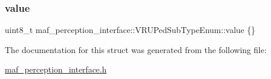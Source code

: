 \subsubsection{\texorpdfstring{value}{value}}
{\footnotesize\ttfamily uint8\+\_\+t maf\+\_\+perception\+\_\+interface\+::\+V\+R\+U\+Ped\+Sub\+Type\+Enum\+::value \{\}}



The documentation for this struct was generated from the following file\+:\begin{DoxyCompactItemize}
\item 
\hyperlink{maf__perception__interface_8h}{maf\+\_\+perception\+\_\+interface.\+h}\end{DoxyCompactItemize}
